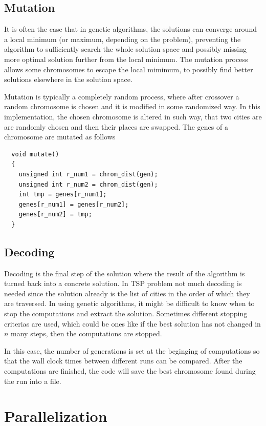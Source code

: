 \documentclass[12pt]{article}
\begin{document}
\subsection{Mutation}

It is often the case that in genetic algorithms, the solutions can converge around a local minimum
(or maximum, depending on the problem), preventing the algorithm to sufficiently search the whole
solution space and possibly missing more optimal solution further from the local minimum. The
mutation process allows some chromosomes to escape the local mimimum, to possibly find better
solutions elsewhere in the solution space.

Mutation is typically a completely random process, where after crossover a random chromosome is
chosen and it is modified in some randomized way. In this implementation, the chosen chromosome is
altered in such way, that two cities are are randomly chosen and then their places are swapped.
The genes of a chromosome are mutated as follows
\begin{lstlisting}
  void mutate()
  {
    unsigned int r_num1 = chrom_dist(gen);
    unsigned int r_num2 = chrom_dist(gen);
    int tmp = genes[r_num1];
    genes[r_num1] = genes[r_num2];
    genes[r_num2] = tmp;
  }
\end{lstlisting}

\subsection{Decoding}

Decoding is the final step of the solution where the result of the algorithm is turned back into a
concrete solution. In TSP problem not much decoding is needed since the solution already is the
list of cities in the order of which they are traversed. In using genetic algorithms, it might be
difficult to know when to stop the computations and extract the solution. Sometimes different
stopping criterias are used, which could be ones like if the best solution has not changed in $n$
many steps, then the computations are stopped.

In this case, the number of generations is set at
the beginging of computations so that the wall clock times between different runs can be compared.
After the computations are finished, the code will save the best chromosome found during the run
into a file.

\section{Parallelization}
\end{document}
